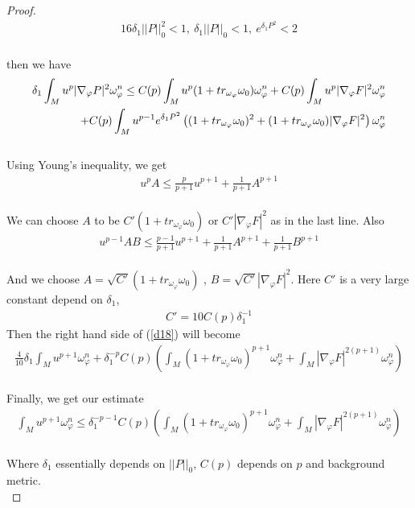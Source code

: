 \documentclass[11pt]{amsart}
\numberwithin{equation}{section}
\begin{document}
\begin{proof}
\begin{align}
	16\delta_1||P||_0^2 <1,\ \delta_1||P||_0 <1,\ e^{\delta_1P^2}<2
\end{align}\\
then we have 
\begin{align}\label{d18}
	\delta_1 \int_M u^p|\nabla_{\varphi}P|^2 \omega_{\varphi}^n \le  C(p) \int_M u^p (1+tr_{\omega_{\varphi}}\omega_0)\omega_\varphi^n +C(p)\int_M u^p |\nabla_\varphi F|^2\omega_\varphi^n \notag\\
	\quad + C(p) \int_M u^{p-1}e^{\delta_1P^2} \left((1+tr_{\omega_{\varphi}}\omega_0)^2 + (1+tr_{\omega_{\varphi}}\omega_0)|\nabla_\varphi F|^2\right) \omega_\varphi^n
\end{align}\\
Using Young's inequality, we get
\begin{align}
	u^p A\le \frac{p}{p+1}u^{p+1}+\frac{1}{p+1}A^{p+1}
\end{align}\\
We can choose $A$ to be $C'(1+tr_{\omega_{\varphi}}\omega_0)$ or $C'|\nabla_\varphi F|^2$ as in the last line. Also 
\begin{align}
	u^{p-1}AB\le \frac{p-1}{p+1}u^{p+1}+\frac{1}{p+1}A^{p+1}+\frac{1}{p+1}B^{p+1}
\end{align}\\
And we choose $A=\sqrt{C'}(1+tr_{\omega_{\varphi}}\omega_0)$ , $B=\sqrt{C'}|\nabla_\varphi F|^2$. Here $C'$ is a very large constant depend on $\delta_1$,
\begin{align}
	C'= 10 C(p)\delta_1^{-1}
\end{align}
Then the right hand side of (\ref{d18}) will become
\begin{align}
	\frac{4}{10}\delta_1 \int_M u^{p+1}\omega_\varphi^n + \delta_1^{-p}C(p)\left( \int_M (1+tr_{\omega_{\varphi}}\omega_0)^{p+1}\omega_\varphi^n + \int_M |\nabla_\varphi F|^{2(p+1)}\omega_\varphi^n \right)
\end{align}\\
Finally, we get our estimate 
\begin{align}
	\int_M u^{p+1}\omega_\varphi^n \le \delta_1^{-p-1}C(p)\left( \int_M (1+tr_{\omega_{\varphi}}\omega_0)^{p+1}\omega_\varphi^n + \int_M |\nabla_\varphi F|^{2(p+1)}\omega_\varphi^n \right)
\end{align}\\
Where $\delta_1$ essentially depends on $||P||_0$, $C(p)$ depends on $p$ and background metric. \\ 
\end{proof}
\end{document}
